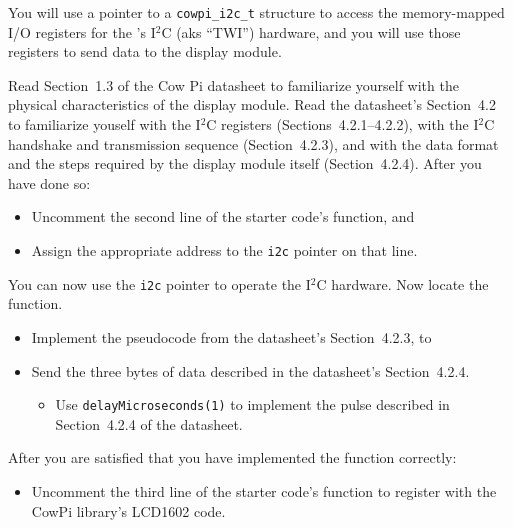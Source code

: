 You will use a pointer to a \lstinline{cowpi_i2c_t} structure to access the memory-mapped I/O registers for the \developmentboard's I$^2$C (aks ``TWI'') hardware,
and you will use those registers to send data to the display module.

Read Section~1.3 of the Cow Pi datasheet to familiarize yourself with the physical characteristics of the display module.
Read the datasheet's Section~4.2 to familiarize youself with the I$^2$C registers (Sections~4.2.1--4.2.2), with the I$^2$C handshake and transmission sequence (Section~4.2.3), and with the data format and the steps required by the display module itself (Section~4.2.4). After you have done so:

\begin{itemize}
    \item Uncomment the second line of the starter code's  function, and
    \item Assign the appropriate address to the \lstinline{i2c} pointer on that line.
\end{itemize}

You can now use the \lstinline{i2c} pointer to operate the I$^2$C hardware.
Now locate the  function.

\begin{itemize}
    \item Implement the pseudocode from the datasheet's Section~4.2.3, to
    \item Send the three bytes of data described in the datasheet's Section~4.2.4.
        \begin{itemize}
            \item Use \lstinline{delayMicroseconds(1)} to implement the pulse described in Section~4.2.4 of the datasheet.
        \end{itemize}
\end{itemize}

After you are satisfied that you have implemented the  function correctly:

\begin{itemize}
    \item Uncomment the third line of the starter code's  function to register  with the CowPi library's LCD1602 code.
\end{itemize}

